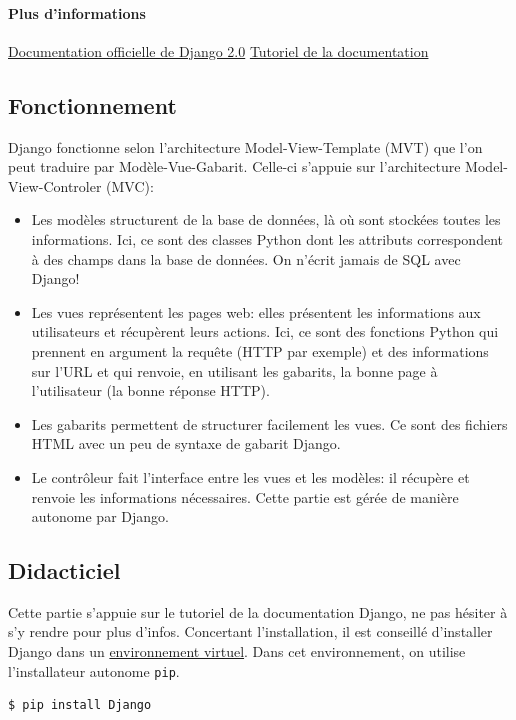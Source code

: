 \documentclass[a4paper, 10pt]{article}
\begin{document}
\paragraph{Plus d'informations} \href{https://docs.djangoproject.com/fr/2.0/}{Documentation officielle de Django 2.0} \href{https://docs.djangoproject.com/fr/2.0/intro/}{Tutoriel de la documentation}

\subsection{Fonctionnement}

Django fonctionne selon l'architecture Model-View-Template (MVT) que l'on peut traduire par Modèle-Vue-Gabarit. Celle-ci s’appuie sur l'architecture Model-View-Controler (MVC):
\begin{itemize}
    \item Les modèles structurent de la base de données, là où sont stockées toutes les informations. Ici, ce sont des classes Python dont les attributs correspondent à des champs dans la base de données. On n'écrit jamais de SQL avec Django!
    \item Les vues représentent les pages web: elles présentent les informations aux utilisateurs et récupèrent leurs actions. Ici, ce sont des fonctions Python qui prennent en argument la requête (HTTP par exemple) et des informations sur l’URL et qui renvoie, en utilisant les gabarits, la bonne page à l'utilisateur (la bonne réponse HTTP).
    \item Les gabarits permettent de structurer facilement les vues. Ce sont des fichiers HTML avec un peu de syntaxe de gabarit Django.
    \item Le contrôleur fait l'interface entre les vues et les modèles: il récupère et renvoie les informations nécessaires. Cette partie est gérée de manière autonome par Django.
\end{itemize}

\subsection{Didacticiel}
Cette partie s'appuie sur le tutoriel de la documentation Django, ne pas hésiter à s'y rendre pour plus d'infos. Concertant l'installation, il est conseillé d'installer Django dans un \hyperref[virtualenv]{environnement virtuel}. Dans cet environnement, on utilise l'installateur autonome \texttt{pip}.

\begin{verbatim}
$ pip install Django
\end{verbatim}
\end{document}
